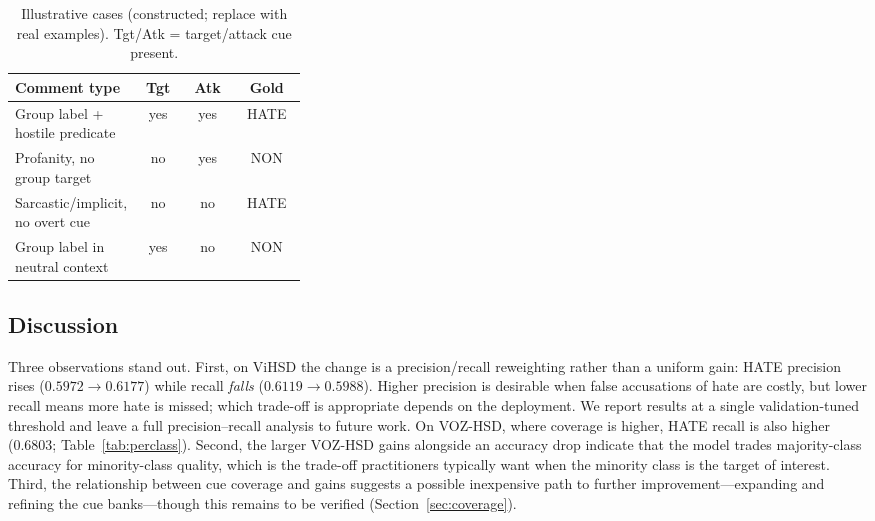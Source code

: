 \documentclass[11pt]{article}
\begin{document}
\begin{table}[!t]
  \centering
  \small
  \begin{tabular}{p{0.34\linewidth}ccc}
    \toprule
    \textbf{Comment type} & \textbf{Tgt} & \textbf{Atk} & \textbf{Gold} \\
    \midrule
    Group label + hostile predicate     & yes & yes & HATE \\
    Profanity, no group target           & no  & yes & NON \\
    Sarcastic/implicit, no overt cue     & no  & no  & HATE \\
    Group label in neutral context       & yes & no  & NON \\
    \bottomrule
  \end{tabular}
  \caption{Illustrative cases (constructed; replace with real examples). Tgt/Atk = target/attack cue present.}
  \label{tab:qual}
\end{table}

\subsection{Discussion}
Three observations stand out. First, on ViHSD the change is a precision/recall reweighting rather than a uniform gain: HATE precision rises ($0.5972\!\to\!0.6177$) while recall \emph{falls} ($0.6119\!\to\!0.5988$). Higher precision is desirable when false accusations of hate are costly, but lower recall means more hate is missed; which trade-off is appropriate depends on the deployment. We report results at a single validation-tuned threshold and leave a full precision--recall analysis to future work. On VOZ-HSD, where coverage is higher, HATE recall is also higher (0.6803; Table~\ref{tab:perclass}). Second, the larger VOZ-HSD gains alongside an accuracy drop indicate that the model trades majority-class accuracy for minority-class quality, which is the trade-off practitioners typically want when the minority class is the target of interest. Third, the relationship between cue coverage and gains suggests a possible inexpensive path to further improvement---expanding and refining the cue banks---though this remains to be verified (Section~\ref{sec:coverage}).
\end{document}
